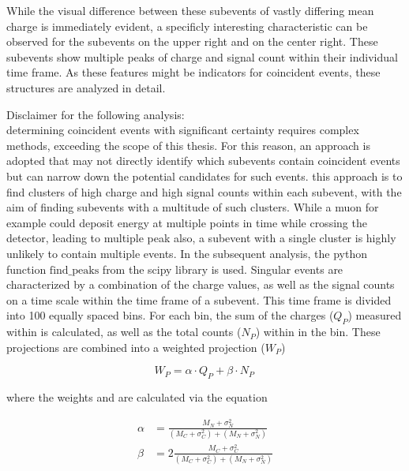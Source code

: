 

While the visual difference between these subevents of vastly differing mean charge is immediately evident, a specificly interesting characteristic can be 
observed for the subevents on the upper right and on the center right. These subevents show multiple peaks of charge and signal count within their individual time frame. As these features
might be indicators for coincident events, these structures are analyzed in detail. 

Disclaimer for the following analysis: \\
determining coincident events with significant certainty requires complex methods, exceeding the scope of this thesis. For this reason, an approach is adopted that may 
not directly identify which subevents contain coincident events but can narrow down the potential candidates for such events. this approach is to find clusters of 
high charge and high signal counts within each subevent, with the aim of finding subevents with a multitude of such clusters. While a muon for example could deposit 
energy at multiple points in time while crossing the detector, leading to multiple peak also, a subevent with a single cluster is highly unlikely to contain multiple
events. 
In the subsequent analysis, the python function $\text{find\_peaks}$ from 
the scipy library is used. Singular events are characterized by a combination of the charge values, as well as the signal counts on a time scale within the time 
frame of a subevent. This time frame is divided into \num{100} equally spaced bins. For each bin, the sum of the charges ($Q_P$) measured within is calculated, 
as well as the total counts ($N_P$) within in the bin. These projections are combined into a weighted projection ($W_P$)

\begin{equation}
    W_P = \alpha\cdot Q_P +  \beta\cdot N_P\,
\end{equation}

where the weights \alpha and \beta are calculated via the equation

\begin{align}
    \alpha &= \frac{M_N + \sigma_N^2}{(M_C + \sigma_C^2) + (M_N + \sigma_N^2)} \\
    \beta &= 2\frac{M_C + \sigma_C^2}{(M_C + \sigma_C^2) + (M_N + \sigma_N^2)}
\end{align}


